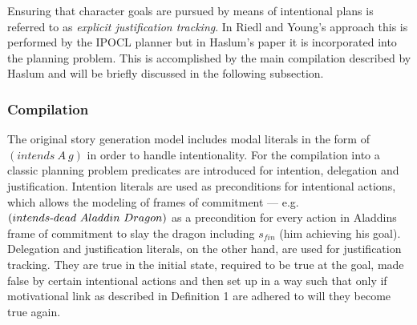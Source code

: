 Ensuring that character goals are pursued by means of intentional plans is referred to as \emph{explicit justification tracking}. In Riedl and Young's approach \cite{Riedl10} this is performed by the IPOCL planner but in Haslum's paper \cite{Haslum14} it is incorporated into the planning problem. This is accomplished by the main compilation described by Haslum and will be briefly discussed in the following subsection.

\subsubsection{Compilation}
The original story generation model includes modal literals in the form of $(intends\ A\ g)$ in order to handle intentionality. For the compilation into a classic planning problem predicates are introduced for intention, delegation and justification. Intention literals are used as preconditions for intentional actions, which allows the modeling of frames of commitment --- e.g. $(intends\h dead\ Aladdin\ Dragon)$ as a precondition for every action in Aladdins frame of commitment to slay the dragon including $s_{fin}$ (him achieving his goal). Delegation and justification literals, on the other hand, are used for justification tracking. They are true in the initial state, required to be true at the goal, made false by certain intentional actions and then set up in a way such that only if motivational link as described in Definition 1 are adhered to will they become true again.

